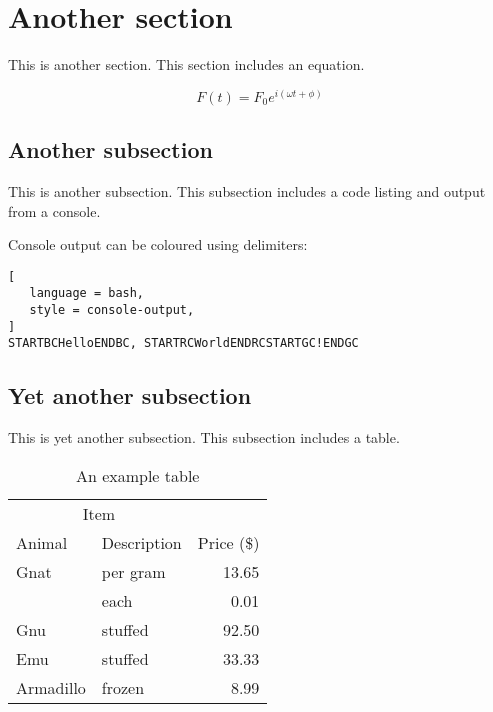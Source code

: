 \section{Another section}

This is another section. This section includes an equation.

$$
F(t) = F_0 e^{i (\omega t + \phi)}
$$

\subsection{Another subsection}

This is another subsection. This subsection includes a code listing and output from a console.



Console output can be coloured using delimiters:

\begin{lstlisting}[
   language = bash,
   style = console-output,
]
STARTBCHelloENDBC, STARTRCWorldENDRCSTARTGC!ENDGC
\end{lstlisting}

\subsection{Yet another subsection}
This is yet another subsection. This subsection includes a table.

\begin{table}[ht]
    \centering
	\begin{tabular}{@{}llr@{}} \toprule
		\multicolumn{2}{c}{Item} \\ \cmidrule(r){1-2}
		Animal & Description & Price (\$)\\ \midrule
		Gnat & per gram & 13.65 \\
		& each & 0.01 \\
		Gnu & stuffed & 92.50 \\
		Emu & stuffed & 33.33 \\
		Armadillo & frozen & 8.99 \\ \bottomrule
	\end{tabular}
    \caption{An example table}
    \label{example-table}
\end{table}